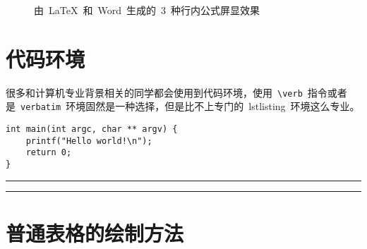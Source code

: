 \begin{figure}[htbp]
\centering
{}

\caption{由~\LaTeX~和~Word~生成的~3~种行内公式屏显效果}\label{fig:hangju}
\vspace{-1em}
\end{figure}

\section{代码环境}

很多和计算机专业背景相关的同学都会使用到代码环境，使用~\verb|\verb|~指令或者是~\verb|verbatim|~环境固然是一种选择，但是比不上专门的~lstlisting~环境这么专业。

\begin{lstlisting}
int main(int argc, char ** argv) {
    printf("Hello world!\n");
    return 0;
}
\end{lstlisting}

\noindent\hrule
\vspace{0.1em}\noindent\hrule

\vspace{1em}

\section{普通表格的绘制方法}


